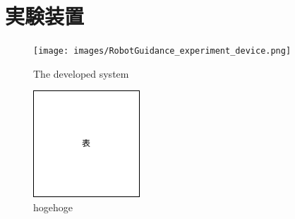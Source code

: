 
\section{実験装置}

  \begin{figure}[h]
    \centering
    \texttt{[image: images/RobotGuidance\_experiment\_device.png]}
    \captionsetup{justification=raggedright} %
    \caption{The developed system}
    \label{Fig:RobotGuidance_experiment_device}
  \end{figure}

  \begin{figure}[h]
    \centering
    \includegraphics[keepaspectratio, scale=0.60] {images/table.png}
    \captionsetup{justification=raggedright} %
    \caption{hogehoge}
    \label{Fig:4.2hoge}
  \end{figure}

\newpage
